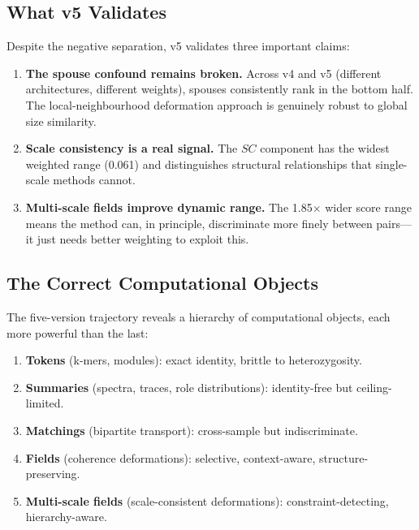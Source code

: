 \documentclass{../yalumba}
\begin{document}
\subsection{What v5 Validates}

Despite the negative separation, v5 validates three important claims:

\begin{enumerate}
  \item \textbf{The spouse confound remains broken.}  Across v4 and v5
    (different architectures, different weights), spouses consistently rank
    in the bottom half.  The local-neighbourhood deformation approach is
    genuinely robust to global size similarity.
  \item \textbf{Scale consistency is a real signal.}  The $SC$ component
    has the widest weighted range (0.061) and distinguishes structural
    relationships that single-scale methods cannot.
  \item \textbf{Multi-scale fields improve dynamic range.}  The 1.85$\times$
    wider score range means the method can, in principle, discriminate more
    finely between pairs---it just needs better weighting to exploit this.
\end{enumerate}

\subsection{The Correct Computational Objects}

The five-version trajectory reveals a hierarchy of computational objects,
each more powerful than the last:

\begin{enumerate}
  \item \textbf{Tokens} (k-mers, modules): exact identity, brittle to
    heterozygosity.
  \item \textbf{Summaries} (spectra, traces, role distributions):
    identity-free but ceiling-limited.
  \item \textbf{Matchings} (bipartite transport): cross-sample but
    indiscriminate.
  \item \textbf{Fields} (coherence deformations): selective, context-aware,
    structure-preserving.
  \item \textbf{Multi-scale fields} (scale-consistent deformations):
    constraint-detecting, hierarchy-aware.
\end{enumerate}

\end{document}
